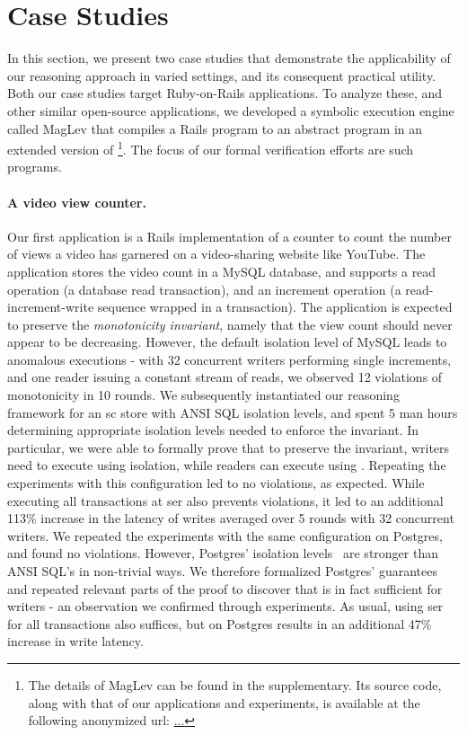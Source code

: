 \section{Case Studies}
\label{sec:case-studies}

In this section, we present two case studies that demonstrate the
applicability of our reasoning approach in varied settings, and its
consequent practical utility. Both our case studies target
Ruby-on-Rails applications. To analyze these, and other similar
open-source applications, we developed a symbolic execution engine
called {\sc MagLev} that compiles a Rails program to an abstract
program in an extended version of \txnimp\footnote{The details of {\sc
MagLev} can be found in the supplementary. Its source code, along with
that of our applications and experiments, is available at the
following anonymized url: \url{...}}. The focus of our formal
verification efforts are such \txnimp programs.

\paragraph{A video view counter.} Our first application is a Rails
implementation of a counter to count the number of views a video has
garnered on a video-sharing website like YouTube. The application
stores the video count in a MySQL database, and supports a read
operation (a database read transaction), and an increment operation (a
read-increment-write sequence wrapped in a transaction).  The
application is expected to preserve the \emph{monotonicity invariant},
namely that the view count should never appear to be decreasing.
However, the default  isolation level of MySQL
leads to anomalous executions - with 32 concurrent writers performing
single increments, and one reader issuing a constant stream of reads,
we observed 12 violations of monotonicity in 10 rounds. We
subsequently instantiated our reasoning framework for an {\sc sc}
store with ANSI SQL isolation levels, and spent 5 man hours
determining appropriate isolation levels needed to enforce the
invariant. In particular, we were able to formally prove that to
preserve the invariant, writers need to execute using
 isolation, while readers can execute using
. Repeating the experiments with this
configuration led to no violations, as expected. While executing all
transactions at {\sc ser} also prevents violations, it led to an
additional 113\% increase in the latency of writes averaged over 5
rounds with 32 concurrent writers.  We repeated the experiments with
the same configuration on Postgres, and found no violations. However,
Postgres' isolation levels~\cite{postgresiso} are stronger than ANSI
SQL's in non-trivial ways. We therefore formalized Postgres'
guarantees and repeated relevant parts of the proof to discover that
 is in fact sufficient for writers - an
observation we confirmed through experiments. As usual, using {\sc
ser} for all transactions also suffices, but on Postgres results in an
additional 47\% increase in write latency.

